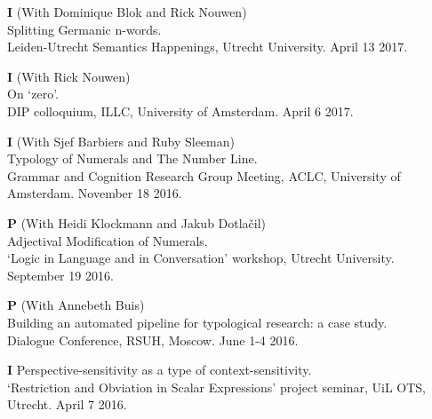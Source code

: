 \documentclass[12pt,letterpaper]{article}
\begin{document}
{\begin{hangparas}{.25in}{1}
\vspace{1mm}

\textbf{I} \hspace{2mm} (With Dominique Blok and Rick Nouwen) \\
Splitting Germanic n-words. \\
Leiden-Utrecht Semantics Happenings, Utrecht University. April 13 2017.

\vspace{1mm}

\textbf{I} \hspace{2mm} (With Rick Nouwen) \\ On `zero'. \\ DIP colloquium, ILLC, University of Amsterdam. April 6 2017.

\vspace{1mm}

\textbf{I} \hspace{2mm} (With Sjef Barbiers and Ruby Sleeman) \\ Typology of Numerals and The Number Line. \\Grammar and Cognition Research Group Meeting, ACLC, University of Amsterdam. November 18 2016.

\vspace{1mm}

\textbf{P} \hspace{2mm} (With Heidi Klockmann and Jakub Dotla\v{c}il) \\
Adjectival Modification of Numerals. \\`Logic in Language and in Conversation' workshop, Utrecht University. September 19 2016.

\vspace{1mm}

\textbf{P} \hspace{2mm} (With Annebeth Buis) \\Building an automated pipeline for typological research: 
a case study. \\Dialogue Conference, RSUH, Moscow. June 1-4 2016.

\vspace{1mm}

\textbf{I} \hspace{2mm} Perspective-sensitivity as a type of context-sensitivity. \\`Restriction and Obviation in Scalar Expressions' project seminar, UiL OTS, Utrecht. April 7 2016. 

\vspace{1mm}


\end{hangparas}}
\end{document}
